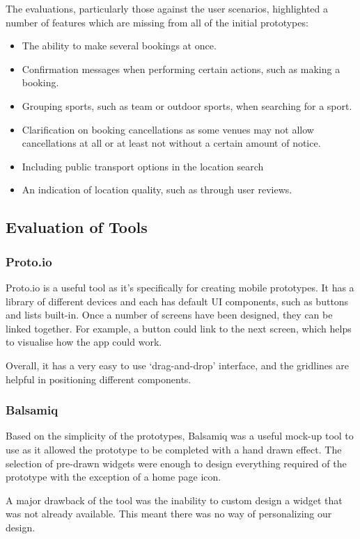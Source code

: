 The evaluations, particularly those against the user scenarios, highlighted a
number of features which are missing from all of the initial prototypes:

\begin{itemize}
	\item The ability to make several bookings at once.
	\item Confirmation messages when performing certain actions, such as making
		a booking.
	\item Grouping sports, such as team or outdoor sports, when searching for a
		sport.
	\item Clarification on booking cancellations as some venues may not allow
		cancellations at all or at least not without a certain amount of
		notice.
	\item Including public transport options in the location search
	\item An indication of location quality, such as through user reviews.
\end{itemize}

\subsection{Evaluation of Tools}

\subsubsection{Proto.io}

Proto.io is a useful tool as it's specifically for creating mobile prototypes.
It has a library of different devices and each has default UI components, such
as buttons and lists built-in. Once a number of screens have been designed,
they can be linked together. For example, a button could link to the next
screen, which helps to visualise how the app could work.

Overall, it has a very easy to use `drag-and-drop' interface, and the gridlines
are helpful in positioning different components.

\subsubsection{Balsamiq}

Based on the simplicity of the prototypes, Balsamiq was a useful mock-up tool
to use as it allowed the prototype to be completed with a hand drawn effect.
The selection of pre-drawn widgets were enough to design everything required of
the prototype with the exception of a home page icon.

A major drawback of the tool was the inability to custom design a widget that
was not already available.  This meant there was no way of personalizing our
design.
\restoregeometry%
